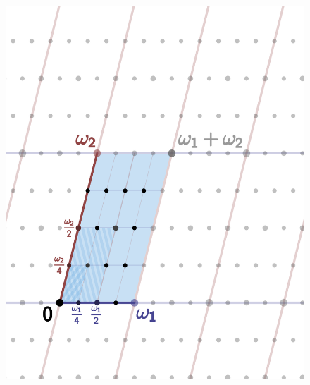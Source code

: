 \begin{frame}[plain]
	\begin{figure}[!ht]
	\centering
	\includegraphics[width=0.7\textheight]{images/lattice.png}
	\end{figure}
\end{frame}



